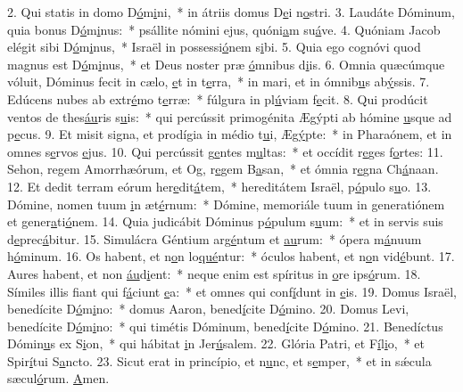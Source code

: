 2. Qui statis in domo D\uline{ó}m\uline{i}ni,~* in átriis domus D\uline{e}i n\uline{o}stri.
3. Laudáte Dóminum, quia bonus D\uline{ó}m\uline{i}nus:~* psállite nómini ejus, quóni\uline{a}m su\uline{á}ve.
4. Quóniam Jacob elégit sibi D\uline{ó}m\uline{i}nus,~* Israël in possessi\uline{ó}nem s\uline{i}bi.
5. Quia ego cognóvi quod magnus est D\uline{ó}m\uline{i}nus,~* et Deus noster præ \uline{ó}mnibus d\uline{i}is.
6. Omnia quæcúmque vóluit, Dóminus fecit in cælo, \uline{e}t in t\uline{e}rra,~* in mari, et in ómnib\uline{u}s ab\uline{ý}ssis.
7. Edúcens nubes ab extr\uline{é}mo t\uline{e}rræ:~* fúlgura in pl\uline{ú}viam f\uline{e}cit.
8. Qui prodúcit ventos de thes\uline{áu}ris s\uline{u}is:~* qui percússit primogénita Ægýpti ab hómine \uline{u}sque ad p\uline{e}cus.
9. Et misit signa, et prodígia in médio t\uline{u}i, Æg\uline{ý}pte:~* in Pharaónem, et in omnes s\uline{e}rvos \uline{e}jus.
10. Qui percússit g\uline{e}ntes m\uline{u}ltas:~* et occídit r\uline{e}ges f\uline{o}rtes:
11. Sehon, regem Amorrhæórum, et Og, r\uline{e}gem B\uline{a}san,~* et ómnia r\uline{e}gna Ch\uline{á}naan.
12. Et dedit terram eórum her\uline{e}dit\uline{á}tem,~* hereditátem Israël, p\uline{ó}pulo s\uline{u}o.
13. Dómine, nomen tuum \uline{i}n æt\uline{é}rnum:~* Dómine, memoriále tuum in generatiónem et gener\uline{a}ti\uline{ó}nem.
14. Quia judicábit Dóminus p\uline{ó}pulum s\uline{u}um:~* et in servis suis d\uline{e}prec\uline{á}bitur.
15. Simulácra Géntium arg\uline{é}ntum et \uline{au}rum:~* ópera m\uline{á}nuum h\uline{ó}minum.
16. Os habent, et n\uline{o}n lo\uline{qué}ntur:~* óculos habent, et n\uline{o}n vid\uline{é}bunt.
17. Aures habent, et non \uline{áu}d\uline{i}ent:~* neque enim est spíritus in \uline{o}re ips\uline{ó}rum.
18. Símiles illis fiant qui f\uline{á}ciunt \uline{e}a:~* et omnes qui conf\uline{í}dunt in \uline{e}is.
19. Domus Israël, benedícite D\uline{ó}m\uline{i}no:~* domus Aaron, bened\uline{í}cite D\uline{ó}mino.
20. Domus Levi, benedícite D\uline{ó}m\uline{i}no:~* qui timétis Dóminum, bened\uline{í}cite D\uline{ó}mino.
21. Benedíctus Dómin\uline{u}s ex S\uline{i}on,~* qui hábitat \uline{i}n Jer\uline{ú}salem.
22. Glória Patri, et F\uline{í}l\uline{i}o,~* et Spir\uline{í}tui S\uline{a}ncto.
23. Sicut erat in princípio, et n\uline{u}nc, et s\uline{e}mper,~* et in sǽcula sæcul\uline{ó}rum. \uline{A}men.
